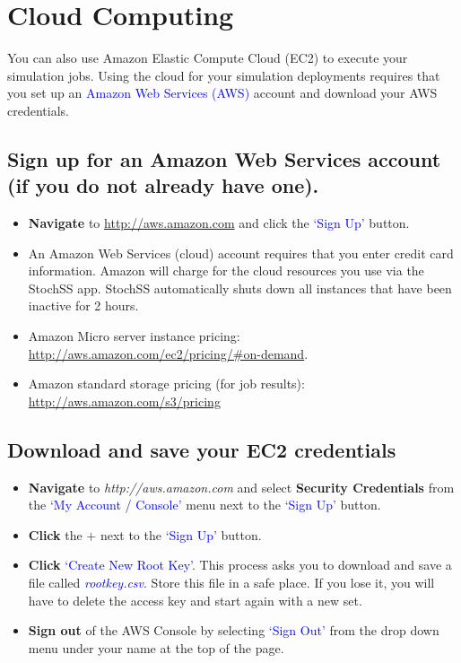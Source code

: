 \section{Cloud Computing}
You can also use Amazon Elastic Compute Cloud (EC2) to execute your simulation jobs. Using the cloud for your simulation deployments requires that you set up an \textcolor{blue}{Amazon Web Services (AWS)} account and download your AWS credentials.
\subsection{Sign up for an Amazon Web Services account (if you do not already have one).}
\begin{itemize}
\item \textbf{Navigate} to \url{http://aws.amazon.com} and click the \textcolor{blue}{`Sign Up'} button.
\item An Amazon Web Services (cloud) account requires that you enter credit card information. Amazon will charge for the cloud resources you use via the StochSS app. StochSS automatically shuts down all instances that have been inactive for 2 hours.
\item Amazon Micro server instance pricing:\\
 \url{http://aws.amazon.com/ec2/pricing/#on-demand}.
\item Amazon standard storage pricing (for job results):\\
\url{http://aws.amazon.com/s3/pricing}
\end{itemize}
\subsection{Download and save your EC2 credentials}
\begin{itemize}
\item \textbf{Navigate} to \textit{http://aws.amazon.com} and select \textbf{Security Credentials} from the \textcolor{blue}{`My Account / Console'} menu next to the \textcolor{blue}{`Sign Up'} button.
\item \textbf{Click} the $+$ next to the \textcolor{blue}{`Sign Up'} button.
\item \textbf{Click} \textcolor{blue}{`Create New Root Key'}. This process asks you to download and save a file called \textcolor{blue}{\textit{rootkey.csv}}. Store this file in a safe place. If you lose it, you will have to delete the access key and start again with a new set.
\item \textbf{Sign out} of the AWS Console by selecting \textcolor{blue}{`Sign Out'} from the drop down menu under your name at the top of the page.
\end{itemize}

